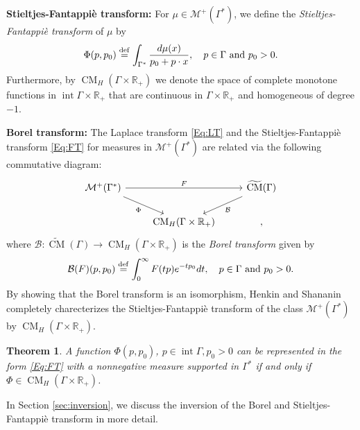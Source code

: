 \documentclass[11pt,reqno]{amsart}
\theoremstyle{plain}
\newtheorem{theorem}{Theorem}[section]
\theoremstyle{definition}
\numberwithin{equation}{section}
\newcommand{\R}{\mathbb{R}}
\newcommand{\bea} {\begin{eqnarray}}
\newcommand{\eea} {\end{eqnarray}}
\newcommand{\bydef}{\stackrel{\rm def}{=}}
\begin{document}
    \vspace{2mm}
    
   \noindent \textbf{Stieltjes-Fantappi\`e transform:} For $\mu \in \mathcal{M}^+(\Gamma^*)$, we define the {\em Stieltjes-Fantappi\`e transform} of $\mu$ by
	\begin{align}\label{Eq:FT}
		\Phi(p, p_0) \bydef \int_{\Gamma^*} \frac{d\mu(x)}{p_0 + p\cdot x}, \ \ \ p\in \Gamma \text{ and } p_0 >0.
	\end{align}
Furthermore, by $\operatorname{CM}_H(\Gamma\times \mathbb{R}_+)$ we denote the space of complete monotone functions in $\operatorname{int} \Gamma \times \mathbb{R}_+$ that are continuous in $\Gamma\times\R_+$ and homogeneous of degree $-1$.

 \vspace{2mm}

\noindent \textbf{Borel transform:}
     The Laplace transform \eqref{Eq:LT} and the Stieltjes-Fantappi\`e transform \eqref{Eq:FT} for measures in $\mathcal M^+(\Gamma^*)$ are related via the following commutative diagram:
     \[
	\begin{tikzcd}
		\mathcal M^+(\Gamma^*) \arrow[rr, "F"] \arrow[dr, "\Phi"'] &     & \widetilde{\operatorname{CM}}(\Gamma) \arrow[dl, "\mathcal B"] \\
		& \operatorname{CM}_H(\Gamma\times \R_+ )&,  
	\end{tikzcd}
	\]
    where $\mathcal B: \widetilde{\operatorname{CM}}(\Gamma)\rightarrow  \operatorname{CM}_H(\Gamma\times \R_+ )$ is the {\em Borel transform} given by
    \bea\label{eq:def borel}
	\mathcal B(F)(p,p_0) \bydef \int_0^\infty F(tp)e^{-tp_0} dt,\ \ \ p\in \Gamma \text{ and } p_0 >0.
	\eea
    By showing that the Borel transform is an isomorphism, Henkin and Shananin \cite[Theorem 2.1$'$]{HS} completely charecterizes the Stieltjes-Fantappi\`e transform of the class $\mathcal M^+(\Gamma^*)$ by $\operatorname{CM}_H(\Gamma\times \mathbb{R}_+)$.

     \begin{theorem} \label{Thm:SF}
		A function $\Phi(p, p_0)$, $p\in \operatorname{int} \Gamma, p_0 > 0$ can be represented in the form \eqref{Eq:FT} with a nonnegative measure supported in $\Gamma^*$ if and only if $\Phi\in \operatorname{CM}_H(\Gamma\times \mathbb{R}_+)$.
	\end{theorem}
    
	In Section \ref{sec:inversion}, we discuss the inversion of the Borel and  Stieltjes-Fantappi\`e transform in more detail.
	
\end{document}
